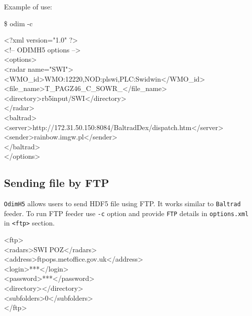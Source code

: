 \documentclass[11p]{article}
\begin{document}
Example of use:

\begin{kod}
\$ odim -c
\end{kod}

\begin{kod}
<?xml version="1.0" ?>\\
<!-- ODIMH5 options -->\\
<options>\\
\hspace*{0.5cm}<radar name="SWI">\\
\hspace*{1cm}<WMO\_id>WMO:12220,NOD:plswi,PLC:Swidwin</WMO\_id>\\
\hspace*{1cm}<file\_name>T\_PAGZ46\_C\_SOWR\_</file\_name>\\
\hspace*{1cm}<directory>rb5input/SWI</directory>\\
\hspace*{0.5cm}</radar>\\
\hspace*{0.5cm}<baltrad>\\
\hspace*{1cm}<server>http://172.31.50.150:8084/BaltradDex/dispatch.htm</server>\\
\hspace*{1cm}<sender>rainbow.imgw.pl</sender>\\
\hspace*{0.5cm}</baltrad>\\
</options>\\
\end{kod}
\subsection{Sending file by FTP}

\texttt{OdimH5} allows users to send HDF5 file using FTP. It works similar to
\texttt{Baltrad} feeder. To run FTP feeder use \texttt{-c} option and provide
\texttt{FTP} details in \texttt{options.xml} in \texttt{<ftp>} section.

\begin{kod} 
\hspace*{0.5cm}<ftp>\\
\hspace*{1cm}<radars>SWI POZ</radars>\\
\hspace*{1cm}<address>ftpops.metoffice.gov.uk</address>\\
\hspace*{1cm}<login>***</login>\\
\hspace*{1cm}<password>***</password>\\
\hspace*{1cm}<directory></directory>\\
\hspace*{1cm}<subfolders>0</subfolders>\\
\hspace*{0.5cm}</ftp>\\
\end{kod}
\end{document}
